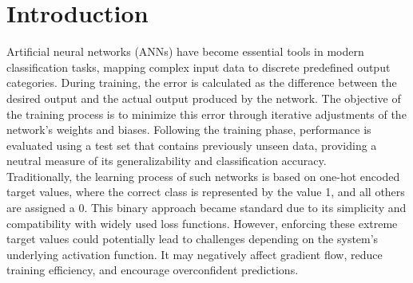 \documentclass[12pt,fleqn,a4paper]{article}
\begin{document}

\vspace{4em}

\section{Introduction}
Artificial neural networks (ANNs) have become essential tools in modern classification tasks, mapping complex input data to discrete predefined output categories. During training, the error is calculated as the difference between the desired output and the actual output produced by the network. The objective of the training process is to minimize this error through iterative adjustments of the network's weights and biases. Following the training phase, performance is evaluated using a test set that contains previously unseen data, providing a neutral measure of its generalizability and classification accuracy. \\

Traditionally, the learning process of such networks is based on one-hot encoded target values, where the correct class is represented by the value 1, and all others are assigned a 0. This binary approach became standard due to its simplicity and compatibility with widely used loss functions. However, enforcing these extreme target values could potentially lead to challenges depending on the system's underlying activation function. It may negatively affect gradient flow, reduce training efficiency, and encourage overconfident predictions.\\
\end{document}
